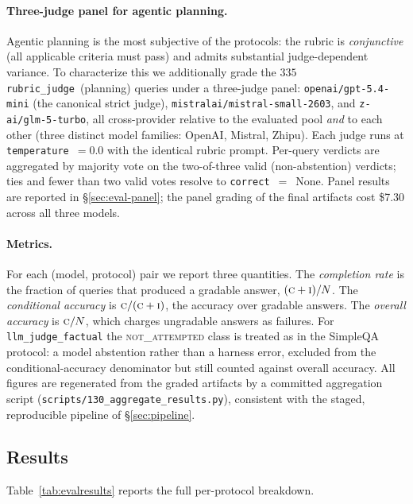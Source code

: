 \documentclass[11pt,a4paper]{article}
\begin{document}
\paragraph{Three-judge panel for agentic planning.} Agentic planning is the
most subjective of the protocols: the rubric is \emph{conjunctive} (all
applicable criteria must pass) and admits substantial judge-dependent
variance. To characterize this we additionally grade the $335$
\texttt{rubric\_judge}~(planning) queries under a three-judge panel:
\texttt{openai/gpt-5.4-mini} (the canonical strict judge),
\texttt{mistralai/mistral-small-2603}, and \texttt{z-ai/glm-5-turbo}, all
cross-provider relative to the evaluated pool \emph{and} to each other (three
distinct model families: OpenAI, Mistral, Zhipu). Each judge runs at
\texttt{temperature}~$=0.0$ with the identical rubric prompt. Per-query
verdicts are aggregated by majority vote on the two-of-three valid
(non-abstention) verdicts; ties and fewer than two valid votes resolve to
\texttt{correct}~$=$~None. Panel results are reported in
§\ref{sec:eval-panel}; the panel grading of the final artifacts cost
\$7.30 across all three models.

\paragraph{Metrics.} For each (model, protocol) pair we report three quantities.
The \emph{completion rate} is the fraction of queries that produced a gradable
answer, $(\textsc{c}+\textsc{i})/N$. The \emph{conditional accuracy} is
$\textsc{c}/(\textsc{c}+\textsc{i})$, the accuracy over gradable answers. The
\emph{overall accuracy} is $\textsc{c}/N$, which charges ungradable answers as
failures. For \texttt{llm\_judge\_factual} the \textsc{not\_attempted} class is
treated as in the SimpleQA protocol: a model abstention rather than a harness
error, excluded from the conditional-accuracy denominator but still counted
against overall accuracy. All figures are regenerated from the graded artifacts
by a committed aggregation script (\texttt{scripts/130\_aggregate\_results.py}),
consistent with the staged, reproducible pipeline of §\ref{sec:pipeline}.

\subsection{Results}

Table~\ref{tab:evalresults} reports the full per-protocol breakdown.
\end{document}
